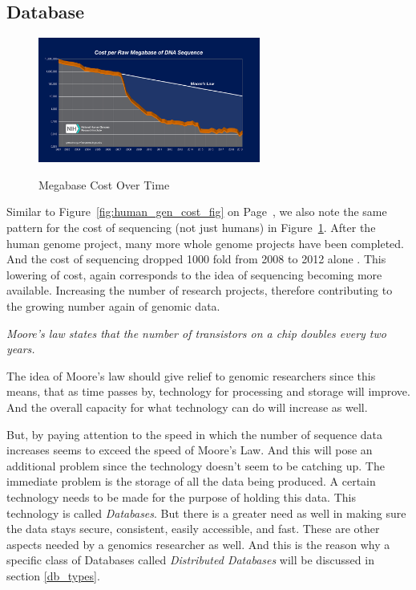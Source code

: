 \documentclass[acmsmall]{acmart}
\begin{document}
\subsection{Database}

\begin{figure}[h]
\caption{Megabase Cost Over Time}
\centering
\includegraphics[width=0.65\textwidth]{images/seq-cost.jpeg} 
\label{fig:megabase_cost_fig}
\end{figure}

Similar to Figure~\ref{fig:human_gen_cost_fig} on Page~\pageref{fig:human_gen_cost_fig}, we also note the same pattern for the cost of sequencing (not just humans) in Figure~\ref{fig:megabase_cost_fig}\cite{genomics-cost}. After the human genome project, many more whole genome projects have been completed. And the cost of sequencing dropped 1000 fold from 2008 to 2012 alone \cite{bon_compression}. This lowering of cost, again corresponds to the idea of sequencing becoming more available. Increasing the number of research projects, therefore contributing to the growing number again of genomic data.
 
\begin{center}
\textit{Moore's law states that the number of transistors on a chip doubles every two years.}\cite{kurose}
\end{center}

The idea of Moore's law should give relief to genomic researchers since this means, that as time passes by, technology for processing and storage will improve. And the overall capacity for what technology can do will increase as well. 

But, by paying attention to the speed in which the number of sequence data increases seems to exceed the speed of Moore's Law. And this will pose an additional problem since the technology doesn't seem to be catching up. The immediate problem is the storage of all the data being produced. A certain technology needs to be made for the purpose of holding this data. This technology is called \textit{Databases}. But there is a greater need as well in making sure the data stays secure, consistent, easily accessible, and fast. These are other aspects needed by a genomics researcher as well. And this is the reason why a specific class of Databases called \textit{Distributed Databases} will be discussed in section \ref{db_types}.
\end{document}
